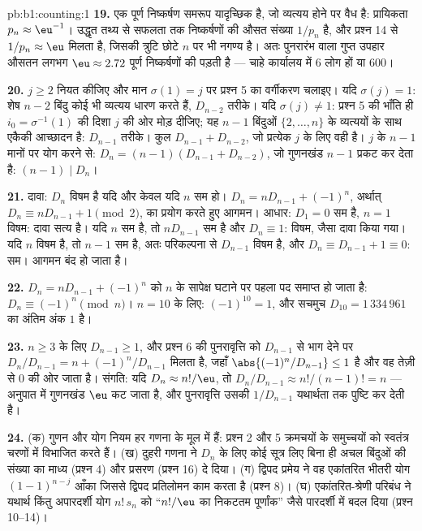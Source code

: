 \begin{solution}{pb:b1:counting:1}
\textbf{19.} एक पूर्ण निष्कर्षण समरूप यादृच्छिक  है, जो व्यत्यय होने
पर वैध है: प्रायिकता $p_n \approx \eu^{-1}$। उद्धृत तथ्य से सफलता तक
निष्कर्षणों की औसत संख्या $1/p_n$ है, और प्रश्न 14 से $1/p_n \approx \eu$
मिलता है, जिसकी त्रुटि छोटे $n$ पर भी नगण्य है। अतः पुनरारंभ वाला गुप्त
उपहार औसतन लगभग $\eu \approx 2.72$ पूर्ण निष्कर्षणों की पड़ती है --- चाहे
कार्यालय में $6$ लोग हों या $600$।

\textbf{20.} $j \geq 2$ नियत कीजिए और मान $\sigma(1) = j$ पर प्रश्न 5 का
वर्गीकरण चलाइए। यदि $\sigma(j) = 1$: शेष $n - 2$ बिंदु कोई भी व्यत्यय धारण
करते हैं, $D_{n-2}$ तरीके। यदि $\sigma(j) \neq 1$: प्रश्न 5 की भाँति ही
 $i_0 = \sigma^{-1}(1)$ की दिशा $j$ की ओर मोड़ दीजिए; यह $n -
1$ बिंदुओं $\{2, \dots, n\}$ के व्यत्ययों के साथ एकैकी आच्छादन है: $D_{n-1}$
तरीके। कुल $D_{n-1} + D_{n-2}$, जो प्रत्येक $j$ के लिए वही है। $j$ के $n -
1$ मानों पर योग करने से: $D_n = (n-1)(D_{n-1} + D_{n-2})$, जो गुणनखंड $n -
1$ प्रकट कर देता है: $(n-1) \mid D_n$।

\textbf{21.} दावा: $D_n$ विषम है यदि और केवल यदि $n$ सम हो। $D_n = nD_{n-1}
+ (-1)^n$, अर्थात् $D_n \equiv nD_{n-1} + 1 \pmod 2$, का प्रयोग करते हुए
आगमन। आधार: $D_1 = 0$ सम है, $n = 1$ विषम: दावा सत्य है। यदि $n$ सम है, तो
$nD_{n-1}$ सम है और $D_n \equiv 1$: विषम, जैसा दावा किया गया। यदि $n$ विषम
है, तो $n - 1$ सम है, अतः परिकल्पना से $D_{n-1}$ विषम है, और $D_n \equiv
D_{n-1} + 1 \equiv 0$: सम। आगमन बंद हो जाता है।

\textbf{22.} $D_n = nD_{n-1} + (-1)^n$ को $n$ के सापेक्ष घटाने पर पहला पद
समाप्त हो जाता है: $D_n \equiv (-1)^n \pmod n$। $n = 10$ के लिए: $(-1)^{10}
= 1$, और सचमुच $D_{10} = 1\,334\,961$ का अंतिम अंक $1$ है।

\textbf{23.} $n \geq 3$ के लिए $D_{n-1} \geq 1$, और प्रश्न 6 की पुनरावृत्ति
को $D_{n-1}$ से भाग देने पर $D_n/D_{n-1} = n + (-1)^n/D_{n-1}$ मिलता है,
जहाँ $\abs{(-1)^n/D_{n-1}} \leq 1$ है और वह तेज़ी से $0$ की ओर जाता है।
संगति: यदि $D_n \approx n!/\eu$, तो $D_n/D_{n-1} \approx n!/(n-1)! = n$ ---
अनुपात में गुणनखंड $\eu$ कट जाता है, और पुनरावृत्ति उसकी $1/D_{n-1}$
यथार्थता तक पुष्टि कर देती है।

\textbf{24.} (क) गुणन और योग नियम हर गणना के मूल में हैं: प्रश्न 2 और 5
क्रमचयों के समुच्चयों को स्वतंत्र चरणों में विभाजित करते हैं। (ख) दुहरी गणना
ने $D_n$ के लिए कोई सूत्र लिए बिना ही अचल बिंदुओं की संख्या का माध्य (प्रश्न
4) और प्रसरण (प्रश्न 16) दे दिया। (ग) द्विपद प्रमेय ने वह एकांतरित भीतरी योग
$(1-1)^{n-j}$ आँका जिससे द्विपद प्रतिलोमन काम करता है (प्रश्न 8)। (घ)
एकांतरित-श्रेणी परिबंध ने यथार्थ किंतु अपारदर्शी योग $n!\,s_n$ को ``$n!/\eu$
का निकटतम पूर्णांक'' जैसे पारदर्शी  में बदल दिया (प्रश्न 10--14)।


\end{solution}
